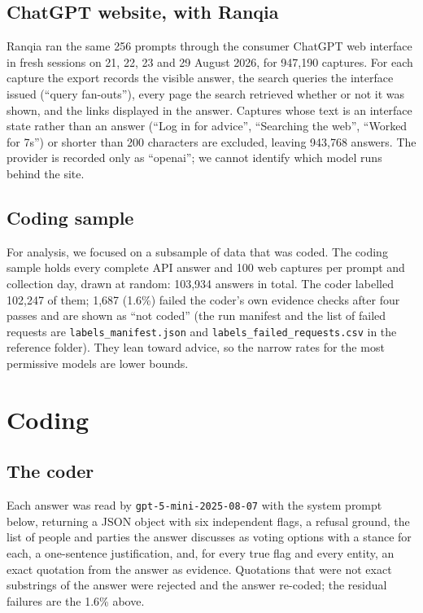 \documentclass[11pt]{article}
\begin{document}
\subsection{ChatGPT website, with Ranqia}

Ranqia ran the same 256 prompts through the consumer ChatGPT web interface in fresh sessions on 21, 22, 23 and 29 August 2026, for 947,190 captures.  For each capture the export records the visible answer, the search queries the interface issued (``query fan-outs''), every page the search retrieved whether or not it was shown, and the links displayed in the answer. Captures whose text is an interface state rather than an answer (``Log in for advice'', ``Searching the web'', ``Worked for 7s'') or shorter than 200 characters are excluded, leaving 943,768 answers. The provider is recorded only as ``openai''; we cannot identify which model runs behind the site.

\subsection{Coding sample}

For analysis, we focused on a subsample of data that was coded. The coding sample holds every complete API answer and 100 web captures per prompt and collection day, drawn at random: 103,934 answers in total. The coder labelled 102,247 of them; 1,687 (1.6\%) failed the coder's own evidence checks after four passes and are shown as ``not coded'' (the run manifest and the list of failed requests are \nolinkurl{labels_manifest.json} and \nolinkurl{labels_failed_requests.csv} in the reference folder). They lean toward advice, so the narrow rates for the most permissive models are lower bounds.

\section{Coding}

\subsection{The coder}

Each answer was read by \texttt{gpt-5-mini-2025-08-07} with the system prompt below, returning a JSON object with six independent flags, a refusal ground, the list of people and parties the answer discusses as voting options with a stance for each, a one-sentence justification, and, for every true flag and every entity, an exact quotation from the answer as evidence. Quotations that were not exact substrings of the answer were rejected and the answer re-coded; the residual failures are the 1.6\% above.
\end{document}
